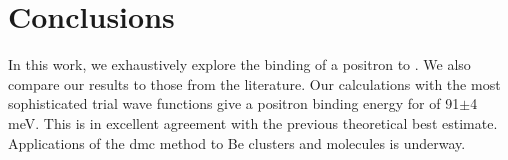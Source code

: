 \section{Conclusions}
In this work, we exhaustively explore the binding of a positron to .
We also compare our results to those from the literature.
Our calculations with the most sophisticated trial wave functions give a positron binding energy for  of 91$\pm$4 meV.
This is in excellent agreement with the previous theoretical best estimate.
Applications of the \gls{dmc} method to Be clusters and molecules is underway.
